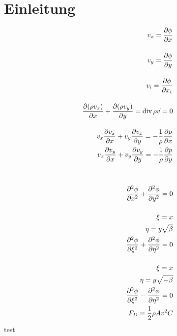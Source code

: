 %
%
%
%
\section{Einleitung\label{ueberschall:Einleitung}}
\begin{align}
    v_x = \frac{\partial \phi}{\partial x}\\
    \intertext{}
    v_y = \frac{\partial \phi}{\partial y}\\
    \intertext{}
    v_i = \frac{\partial\phi}{\partial x_i}\\
    \intertext{}
    \frac{\partial (\rho v_x)}{\partial x} + \frac{\partial (\rho v_y)}{\partial y} = \mathrm{div}\,\rho \vec{v} = 0\\
    \intertext{}
    v_x \frac{\partial v_x}{\partial x} + v_y \frac{\partial v_x}{\partial y} = -\frac{1}{\rho} \frac{\partial p}{\partial x}\\
    v_x \frac{\partial v_y}{\partial x} + v_y \frac{\partial v_y}{\partial y} = -\frac{1}{\rho} \frac{\partial p}{\partial y}\\
    \intertext{}
    \intertext{}
    \frac{\partial^2 \phi}{\partial x^2} + \frac{\partial^2 \phi}{\partial y^2} = 0\\
    \intertext{}
    \xi = x\\
    \eta = y \sqrt{\beta}\\
    \frac{\partial^2 \phi}{\partial \xi^2} + \frac{\partial^2 \phi}{\partial \eta^2} = 0\\
    \intertext{}
    \xi = x\\
    \eta = y \sqrt{-\beta}\\
    \frac{\partial^2 \phi}{\partial \xi^2} - \frac{\partial^2 \phi}{\partial \eta^2} = 0\\
    F_D = \frac{1}{2} \rho A v^2 C
\end{align}
test